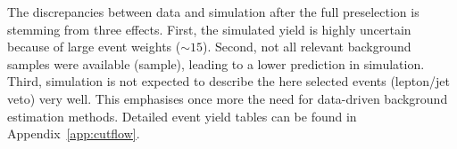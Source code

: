 The discrepancies between data and simulation after the full preselection is stemming from three effects.
First, the simulated yield is highly uncertain because of large event weights ($\sim 15$).
Second, not all relevant background samples were available (\eg \ZInvJets sample), leading to a lower prediction in simulation.
Third, simulation is not expected to describe the here selected events (lepton/jet veto) very well.
This emphasises once more the need for data-driven background estimation methods.
Detailed event yield tables can be found in Appendix~\ref{app:cutflow}.\\
\renewcommand{\arraystretch}{1.5}
\begin{table}
\centering
\caption{Event yields in simulation and data after the selections of each of the categories from Table~\ref{tab:SummaryCuts}}
\label{tab:CutflowALL}
\end{table}
